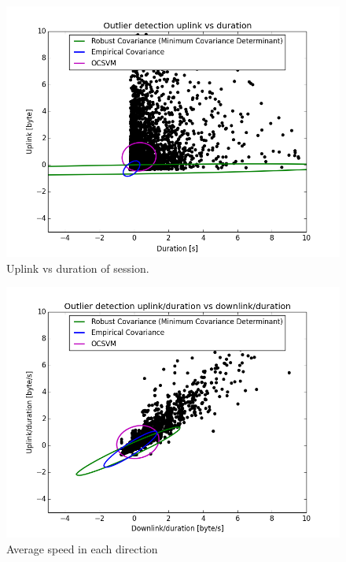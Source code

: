 \begin{figure}
\centering
	\includegraphics[scale=0.6]{figs/scaleUpVSDur.png}
	\caption{Uplink vs duration of session. }
	\label{fig:scaledUpDur}
\end{figure}


\begin{figure}
	\centering
	\includegraphics[scale=0.6]{figs/scaleUpDivDurVSDownDivDur.png}
	\caption{Average speed in each direction}
	\label{fig:scaledUpDownDivDur}
\end{figure}

